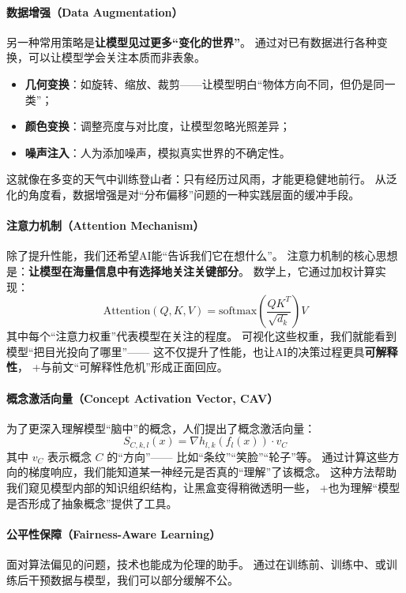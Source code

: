 \paragraph{数据增强（Data Augmentation）}  
另一种常用策略是\textbf{让模型见过更多“变化的世界”}。  
通过对已有数据进行各种变换，可以让模型学会关注本质而非表象。  

\begin{itemize}
\item \textbf{几何变换}：如旋转、缩放、裁剪——让模型明白“物体方向不同，但仍是同一类”；  
\item \textbf{颜色变换}：调整亮度与对比度，让模型忽略光照差异；  
\item \textbf{噪声注入}：人为添加噪声，模拟真实世界的不确定性。  
\end{itemize}
这就像在多变的天气中训练登山者：只有经历过风雨，才能更稳健地前行。
从泛化的角度看，数据增强是对“分布偏移”问题的一种实践层面的缓冲手段。

\paragraph{注意力机制（Attention Mechanism）}  
除了提升性能，我们还希望AI能“告诉我们它在想什么”。  
注意力机制的核心思想是：\textbf{让模型在海量信息中有选择地关注关键部分}。  
数学上，它通过加权计算实现：  
$$\text{Attention}(Q,K,V)=\text{softmax}\left(\frac{QK^T}{\sqrt{d_k}}\right)V$$  
其中每个“注意力权重”代表模型在关注的程度。  
可视化这些权重，我们就能看到模型“把目光投向了哪里”——  
这不仅提升了性能，也让AI的决策过程更具\textbf{可解释性}，  
+与前文“可解释性危机”形成正面回应。

\paragraph{概念激活向量（Concept Activation Vector, CAV）}  
为了更深入理解模型“脑中”的概念，人们提出了概念激活向量：  
$$S_{C,k,l}(x)=\nabla h_{l,k}(f_l(x)) \cdot v_C$$  
其中 $v_C$ 表示概念 $C$ 的“方向”——  
比如“条纹”“笑脸”“轮子”等。  
通过计算这些方向的梯度响应，我们能知道某一神经元是否真的“理解”了该概念。  
这种方法帮助我们窥见模型内部的知识组织结构，让黑盒变得稍微透明一些，  
+也为理解“模型是否形成了抽象概念”提供了工具。

\paragraph{公平性保障（Fairness-Aware Learning）}  
面对算法偏见的问题，技术也能成为伦理的助手。  
通过在训练前、训练中、或训练后干预数据与模型，我们可以部分缓解不公。  

